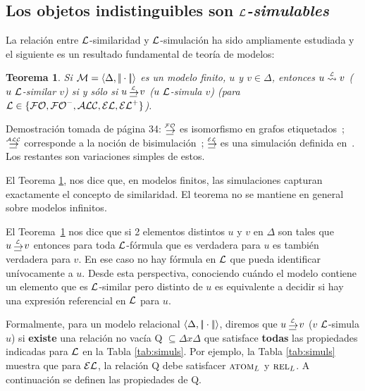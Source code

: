 \subsection{Los objetos indistinguibles son \emph{$\mathcal{L}$-simulables}}

La relaci\'on entre $\mathcal{L}$-similaridad y $\mathcal{L}$-simulaci\'on ha sido ampliamente estudiada y el siguiente es un resultado fundamental de teor\'ia de modelos:


\newtheorem{teorema}{Teorema}
\begin{teorema} \label{thm:simulation}
Si  $\mathcal{M} = \langle \Delta, |\!|\cdot|\!| \rangle$ es un modelo finito, $u$ y $v \in \Delta$, entonces $u \simil{\+L} v$ ($u~\mathcal{L}$-similar $v$) si y s\'olo si 
$u \simul{\+L} v$ ($u~\mathcal{L}$-simula $v$) (para $\mathcal{L} \in \{\mathcal{FO},{\mathcal{FO}^-},\mathcal{ALC},\mathcal{EL},{\mathcal{EL}^+}\}$).
\end{teorema}

Demostraci\'on tomada de \cite{arec:usin11} p\'agina 34: $\simul{\FOL}$ es isomorfismo en
grafos etiquetados~\cite{ebbi:math96}; $\simul{\ALC}$ corresponde a la
noci\'on de bisimulaci\'on~\cite[Def.~2.16]{BRV01}; $\simul{\EL}$ es una
simulaci\'on definida en~\cite[Def.~2.77]{BRV01}. Los restantes son variaciones simples de estos.

El Teorema \ref{thm:simulation}, nos dice que, en modelos finitos, las simulaciones capturan exactamente el concepto de similaridad. El teorema no se mantiene en general sobre modelos infinitos.

El Teorema~\ref{thm:simulation} nos dice que si 2 elementos distintos $u$ y $v$ en $\Delta$ son tales que $u
\simul{\+L} v$ entonces para toda $\mathcal{L}$-f\'ormula que es verdadera para $u$ es tambi\'en verdadera para $v$. En ese caso no hay f\'ormula en $\mathcal{L}$ que pueda identificar un\'ivocamente a $u$. Desde esta perspectiva, conociendo cu\'ando el modelo contiene un elemento que es $\mathcal{L}$-similar pero distinto de $u$ es
equivalente a decidir si hay una expresi\'on referencial en $\mathcal{L}$ para $u$.

Formalmente, para un modelo relacional $\langle \Delta, |\!|\cdot|\!| \rangle$, diremos que $u \simul{\+L} v$ ($v$ $\mathcal{L}$-simula $u$) si \textbf{existe} una relaci\'on no vac\'ia Q $\subseteq \Delta x \Delta$ que satisface \textbf{todas} las propiedades indicadas para $\mathcal{L}$ en la Tabla \ref{tab:simuls}. Por ejemplo, la Tabla \ref{tab:simuls} muestra que para $\mathcal{EL}$, la relaci\'on Q debe satisfacer $\textsc{atom}_L$ y $\textsc{rel}_L$. A continuaci\'on se definen las propiedades de Q.
\smallskip 


